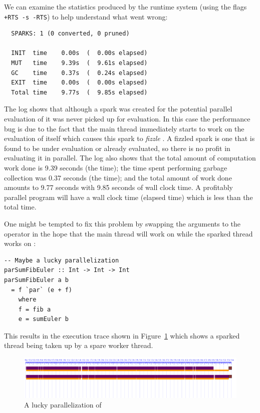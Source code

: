 We can examine the statistics produced by the runtime system (using
the flags \texttt{+RTS -s -RTS}) to help understand what went wrong:

\begin{verbatim}
  SPARKS: 1 (0 converted, 0 pruned)

  INIT  time    0.00s  (  0.00s elapsed)
  MUT   time    9.39s  (  9.61s elapsed)
  GC    time    0.37s  (  0.24s elapsed)
  EXIT  time    0.00s  (  0.00s elapsed)
  Total time    9.77s  (  9.85s elapsed)
\end{verbatim}

The log shows that although a spark was created for the potential
parallel evaluation of  it was never picked up for
evaluation. In this case the performance bug is due to the fact that
the main thread immediately starts to work on the evaluation of
 itself which causes this spark to \emph{fizzle}
\cite{multicore-ghc}.  A fizzled spark is one that is found to be
under evaluation or already evaluated, so there is no profit in
evaluating it in parallel. The log also shows that the total
amount of computation work done is 9.39 seconds (the  time); the time spent performing garbage collection was 0.37 seconds (the  time); and the total amount of work done amounts to 9.77 seconds with 9.85 seconds of wall clock time. A profitably parallel program will have a wall clock time (elapsed time) which is less than the total time.

One might be tempted to fix this problem by swapping the arguments to
the \codef{+} operator in the hope that the main thread will work on
 while the sparked thread works on :

\begin{lstlisting}
-- Maybe a lucky parallelization
parSumFibEuler :: Int -> Int -> Int
parSumFibEuler a b
  = f `par` (e + f)
    where
    f = fib a
    e = sumEuler b
\end{lstlisting}

This results in the execution trace shown in Figure~\ref{f:lucky} which shows a sparked thread being taken up by a spare worker thread. 

\begin{figure}
\begin{center}
\includegraphics[width=18cm]{SumEuler2-N2-eventlog.pdf}
\end{center}
\caption{A lucky parallelization of }
\label{f:lucky}
\end{figure}


